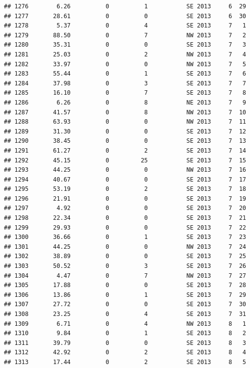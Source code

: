\documentclass[
]{article}
\begin{document}
\begin{verbatim}
## 1276        6.26          0          1           SE 2013     6  29
## 1277       28.61          0          0           SE 2013     6  30
## 1278        5.37          0          4           SE 2013     7   1
## 1279       88.50          0          7           NW 2013     7   2
## 1280       35.31          0          0           SE 2013     7   3
## 1281       25.03          0          2           NW 2013     7   4
## 1282       33.97          0          0           NW 2013     7   5
## 1283       55.44          0          1           SE 2013     7   6
## 1284       37.98          0          3           SE 2013     7   7
## 1285       16.10          0          7           SE 2013     7   8
## 1286        6.26          0          8           NE 2013     7   9
## 1287       41.57          0          8           NW 2013     7  10
## 1288       63.93          0          0           NW 2013     7  11
## 1289       31.30          0          0           SE 2013     7  12
## 1290       38.45          0          0           SE 2013     7  13
## 1291       61.27          0          2           SE 2013     7  14
## 1292       45.15          0         25           SE 2013     7  15
## 1293       44.25          0          0           NW 2013     7  16
## 1294       40.67          0          0           SE 2013     7  17
## 1295       53.19          0          2           SE 2013     7  18
## 1296       21.91          0          0           SE 2013     7  19
## 1297        4.92          0          0           SE 2013     7  20
## 1298       22.34          0          0           SE 2013     7  21
## 1299       29.93          0          0           SE 2013     7  22
## 1300       36.66          0          1           SE 2013     7  23
## 1301       44.25          0          0           NW 2013     7  24
## 1302       38.89          0          0           SE 2013     7  25
## 1303       50.52          0          3           SE 2013     7  26
## 1304        4.47          0          7           NW 2013     7  27
## 1305       17.88          0          0           SE 2013     7  28
## 1306       13.86          0          1           SE 2013     7  29
## 1307       27.72          0          0           SE 2013     7  30
## 1308       23.25          0          4           SE 2013     7  31
## 1309        6.71          0          4           NW 2013     8   1
## 1310        9.84          0          1           SE 2013     8   2
## 1311       39.79          0          0           SE 2013     8   3
## 1312       42.92          0          2           SE 2013     8   4
## 1313       17.44          0          2           SE 2013     8   5

\end{verbatim}
\end{document}
